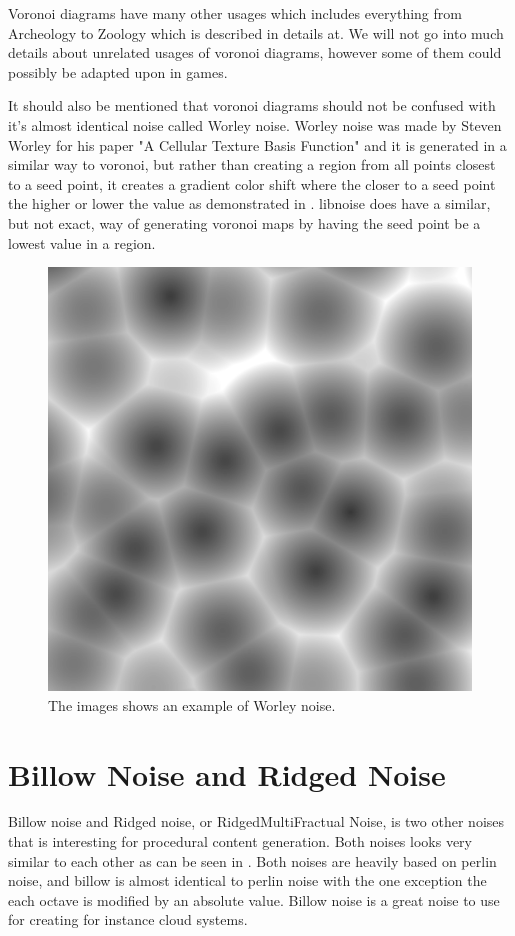 Voronoi diagrams have many other usages which includes everything from Archeology to Zoology which is described in details at\cite{VoronoiDiagrams:Applications}. We will not go into much details about unrelated usages of voronoi diagrams, however some of them could possibly be adapted upon in games. 

It should also be mentioned that voronoi diagrams should not be confused with it's almost identical noise called Worley noise. Worley noise was made by Steven Worley for his paper "A Cellular Texture Basis Function" \cite{worley} and it is generated in a similar way to voronoi, but rather than creating a region from all points closest to a seed point, it creates a gradient color shift where the closer to a seed point the higher or lower the value as demonstrated in . libnoise does have a similar, but not exact, way of generating voronoi maps by having the seed point be a lowest value in a region.

\begin{figure}[H]
	\centering
	\includegraphics[width=0.5\linewidth]{img/worley_noise}
	\caption{The images shows an example of Worley noise.}
	\label{fig:worleynoise}
\end{figure}


\section{Billow Noise and Ridged Noise}
\label{brnoise}
Billow noise and Ridged noise, or RidgedMultiFractual Noise, is two other noises that is interesting for procedural content generation. Both noises looks very similar to each other as can be seen in . Both noises are heavily based on perlin noise, and billow is almost identical to perlin noise with the one exception the each octave is modified by an absolute value\cite{libnoiseBillow}\cite{NoiseMachineMakingNoise}. Billow noise is a great noise to use for creating for instance cloud systems.

